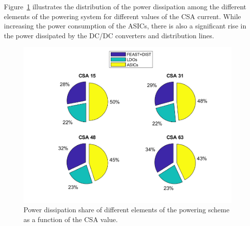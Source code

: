 Figure~\ref{fig_power_CSA} illustrates the distribution of the power dissipation among the different elements of the powering system for different values of the \gls{CSA} current. While increasing the power consumption of the \glspl{ASIC}, there is also a  significant rise in the power dissipated by the DC/DC converters and distribution lines. %

\begin{figure}[h!]
\centering
\includegraphics[width=0.6\columnwidth]{Chapter6/DCS/images/POBpie.png}
\caption{Power dissipation share of different elements of the powering scheme as a function of the \gls{CSA} value.}
\label{fig_power_CSA}
\end{figure}

